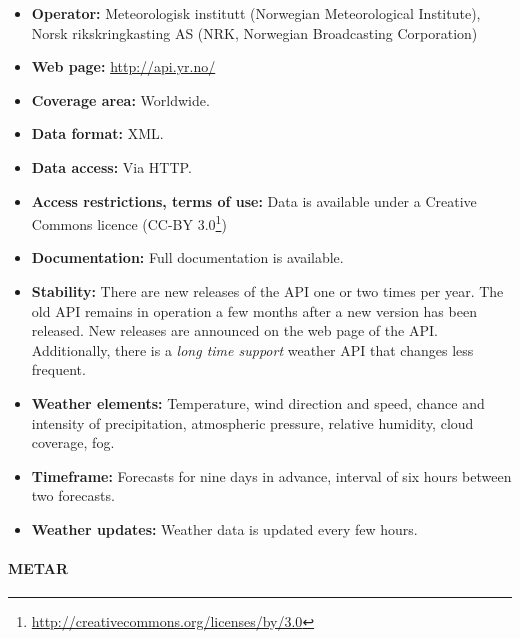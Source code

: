 \begin{itemize}
  \item \textbf{Operator:} Meteorologisk institutt (Norwegian Meteorological Institute), Norsk rikskringkasting AS (NRK, Norwegian Broadcasting Corporation)
  \item \textbf{Web page:} \href{http://api.yr.no/}{http://api.yr.no/}
  \item \textbf{Coverage area:} Worldwide.
  \item \textbf{Data format:} XML.
  \item \textbf{Data access:} Via HTTP.
  \item \textbf{Access restrictions, terms of use:} Data is available under a Creative Commons licence (CC-BY 3.0\footnote{\href{http://creativecommons.org/licenses/by/3.0}{http://creativecommons.org/licenses/by/3.0}})
  \item \textbf{Documentation:} Full documentation is available.
  \item \textbf{Stability:} There are new releases of the API one or two times per year. The old API remains in operation a few months after a new version has been released. New releases are announced on the web page of the API.\\
  Additionally, there is a \emph{long time support} weather API that changes less frequent.
  \item \textbf{Weather elements:} Temperature, wind direction and speed, chance and intensity of precipitation, atmospheric pressure, relative humidity, cloud coverage, fog.
  \item \textbf{Timeframe:} Forecasts for nine days in advance, interval of six hours between two forecasts.
  \item \textbf{Weather updates:} Weather data is updated every few hours.
\end{itemize}

\paragraph{METAR}

